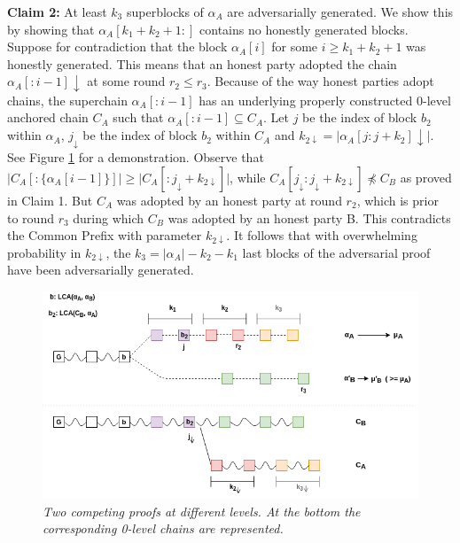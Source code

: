 \documentclass[9pt,a4paper]{article}
\begin{document}
\textbf{Claim 2:} At least $k_3$ superblocks of $\alpha_A$ are adversarially generated. We show this by showing that $\alpha_A[k_1 + k_2 + 1:]$ contains no honestly generated blocks. Suppose for contradiction that the block $\alpha_A[i]$ for some $i \geq k_1 + k_2 + 1$ was honestly generated. This means that an honest party adopted the chain $\alpha_A[:i - 1]\downarrow$ at some round $r_2 \leq r_3$. Because of the way honest parties adopt chains, the superchain $\alpha_A[:i - 1]$ has an underlying properly constructed 0-level anchored chain $C_A$ such that $\alpha_A[:i - 1] \subseteq C_A$. Let $j$ be the index of block $b_2$ within $\alpha_A$, $j_\downarrow$ be the index of block $b_2$ within $C_A$ and $k_{2\downarrow} = \vert \alpha_A[j:j+k_2]\downarrow\vert$. See Figure \ref{fig:proof} for a demonstration. Observe that $\vert C_A[:\{\alpha_A[i-1]\}] \vert \geq \vert C_A[:{j_\downarrow}+k_{2\downarrow}] \vert$, while $C_A[j_\downarrow:j_\downarrow + k_{2\downarrow}] \npreceq C_B$ as proved in Claim 1. But $C_A$ was adopted by an honest party at round $r_2$, which is prior to round $r_3$ during which $C_B$ was adopted by an honest party B. This contradicts the Common Prefix\cite{Backbone} with parameter $k_{2\downarrow}$. It follows that with overwhelming probability in $k_{2\downarrow}$, the $k_3 = \vert \alpha_A \vert - k_2 - k_1$ last blocks of the adversarial proof have been adversarially generated.\\

\begin{figure}[h]
	\begin{center}
		\includegraphics[scale=0.5]{figures/proof.png}
	\end{center}
	\caption{\textit{Two competing proofs at different levels. At the bottom the corresponding 0-level chains are represented.}}
	\label{fig:proof}
\end{figure}
\end{document}
